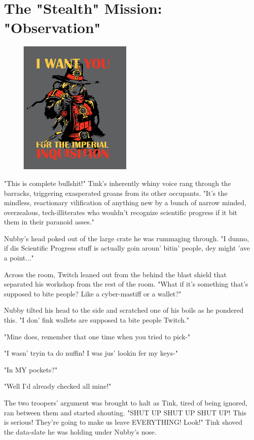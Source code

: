 \chapter{The "Stealth" Mission: "Observation"}

\begin{figure}
	\begin{center}
		\includegraphics[width=\figwidth]{pics/17/1.png}
	\end{center}
\end{figure}
"This is complete bullshit!"  Tink's inherently whiny voice rang through the barracks, triggering exasperated groans from its other occupants. 
"It's the mindless, reactionary vilification of anything new by a bunch of narrow minded, overzealous, tech-illiterates who wouldn't recognize scientific progress if it bit them in their paranoid asses."

Nubby's head poked out of the large crate he was rummaging through. 
"I dunno, if dis Scientific Progress stuff is actually goin aroun' bitin' people, dey might 'ave a point..."

Across the room, Twitch leaned out from the behind the blast shield that separated his workshop from the rest of the room. 
"What if it's something that's supposed to bite people? 
Like a cyber-mastiff or a wallet?"

Nubby tilted his head to the side and scratched one of his boils as he pondered this. 
"I don' fink wallets are supposed ta bite people Twitch."

"Mine does, remember that one time when you tried to pick-"

"I wasn' tryin ta do nuffin! 
I was jus' lookin fer my keys-"

"In MY pockets?"

"Well I'd already checked all mine!"

The two troopers' argument was brought to halt as Tink, tired of being ignored, ran between them and started shouting. 
"SHUT UP SHUT UP SHUT UP! 
This is serious! 
They're going to make us leave EVERYTHING! 
Look!" Tink shoved the data-slate he was holding under Nubby's nose.

